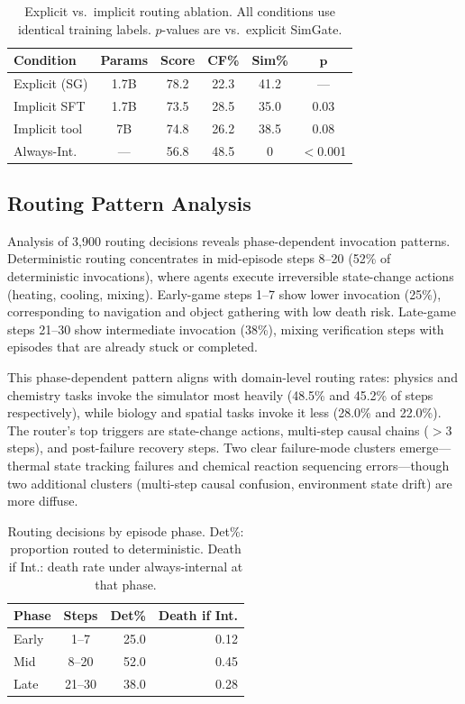 \documentclass[11pt,a4paper]{article}
\begin{document}
\begin{table}[t]
\centering
\small
\begin{tabular}{@{}lccccc@{}}
\toprule
\textbf{Condition} & \textbf{Params} & \textbf{Score} & \textbf{CF\%} & \textbf{Sim\%} & $\boldsymbol{p}$ \\
\midrule
Explicit (SG) & 1.7B & 78.2 & 22.3 & 41.2 & --- \\
Implicit SFT & 1.7B & 73.5 & 28.5 & 35.0 & 0.03 \\
Implicit tool & 7B & 74.8 & 26.2 & 38.5 & 0.08 \\
Always-Int. & --- & 56.8 & 48.5 & 0 & $<$0.001 \\
\bottomrule
\end{tabular}
\caption{Explicit vs.\ implicit routing ablation. All conditions use identical training labels. $p$-values are vs.\ explicit SimGate.}
\label{tab:explicit}
\end{table}

\subsection{Routing Pattern Analysis}
\label{sec:routing_patterns}

Analysis of 3{,}900 routing decisions reveals phase-dependent invocation patterns. Deterministic routing concentrates in mid-episode steps 8--20 (52\% of deterministic invocations), where agents execute irreversible state-change actions (heating, cooling, mixing). Early-game steps 1--7 show lower invocation (25\%), corresponding to navigation and object gathering with low death risk. Late-game steps 21--30 show intermediate invocation (38\%), mixing verification steps with episodes that are already stuck or completed.

This phase-dependent pattern aligns with domain-level routing rates: physics and chemistry tasks invoke the simulator most heavily (48.5\% and 45.2\% of steps respectively), while biology and spatial tasks invoke it less (28.0\% and 22.0\%). The router's top triggers are state-change actions, multi-step causal chains ($>$3 steps), and post-failure recovery steps. Two clear failure-mode clusters emerge---thermal state tracking failures and chemical reaction sequencing errors---though two additional clusters (multi-step causal confusion, environment state drift) are more diffuse.

\begin{table}[t]
\centering
\small
\begin{tabular}{@{}lcrr@{}}
\toprule
\textbf{Phase} & \textbf{Steps} & \textbf{Det\%} & \textbf{Death if Int.} \\
\midrule
Early & 1--7 & 25.0 & 0.12 \\
Mid & 8--20 & 52.0 & 0.45 \\
Late & 21--30 & 38.0 & 0.28 \\
\bottomrule
\end{tabular}
\caption{Routing decisions by episode phase. Det\%: proportion routed to deterministic. Death if Int.: death rate under always-internal at that phase.}
\label{tab:phase}
\end{table}
\end{document}
